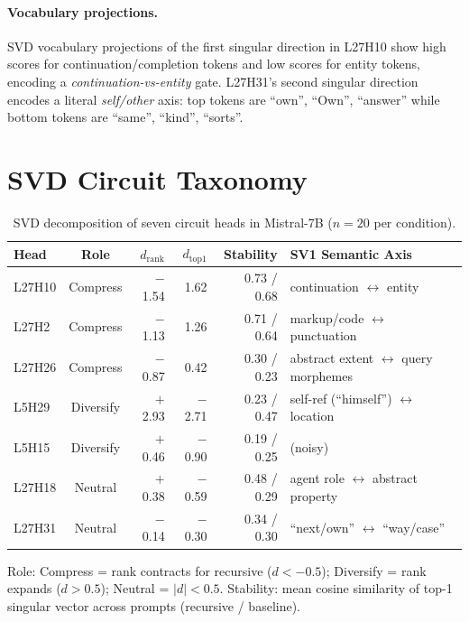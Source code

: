 \documentclass{article}
\newcommand{\dcohen}{d}
\begin{document}
\paragraph{Vocabulary projections.}
SVD vocabulary projections of the first singular direction in L27H10 show high scores for
continuation/completion tokens and low scores for entity tokens, encoding a
\emph{continuation-vs-entity} gate.
L27H31's second singular direction encodes a literal \emph{self/other} axis:
top tokens are ``own'', ``Own'', ``answer'' while bottom tokens are ``same'', ``kind'', ``sorts''.


\section{SVD Circuit Taxonomy}
\label{app:svd_taxonomy}

\begin{table}[h]
\centering
\caption{SVD decomposition of seven circuit heads in Mistral-7B ($n = 20$ per condition).}
\label{tab:svd_heads}
\small
\begin{tabular}{lcrrrl}
\toprule
Head & Role & $\dcohen_{\text{rank}}$ & $\dcohen_{\text{top1}}$ & Stability & SV1 Semantic Axis \\
\midrule
L27H10 & Compress & $-$1.54 & 1.62 & 0.73 / 0.68 & continuation $\leftrightarrow$ entity \\
L27H2  & Compress & $-$1.13 & 1.26 & 0.71 / 0.64 & markup/code $\leftrightarrow$ punctuation \\
L27H26 & Compress & $-$0.87 & 0.42 & 0.30 / 0.23 & abstract extent $\leftrightarrow$ query morphemes \\
L5H29  & Diversify & $+$2.93 & $-$2.71 & 0.23 / 0.47 & self-ref (``himself'') $\leftrightarrow$ location \\
L5H15  & Diversify & $+$0.46 & $-$0.90 & 0.19 / 0.25 & (noisy) \\
L27H18 & Neutral & $+$0.38 & $-$0.59 & 0.48 / 0.29 & agent role $\leftrightarrow$ abstract property \\
L27H31 & Neutral & $-$0.14 & $-$0.30 & 0.34 / 0.30 & ``next/own'' $\leftrightarrow$ ``way/case'' \\
\bottomrule
\end{tabular}
\vspace{1mm}

\raggedright\footnotesize
Role: Compress = rank contracts for recursive ($\dcohen < -0.5$);
Diversify = rank expands ($\dcohen > 0.5$);
Neutral = $|\dcohen| < 0.5$.
Stability: mean cosine similarity of top-1 singular vector across prompts (recursive / baseline).
\end{table}
\end{document}
